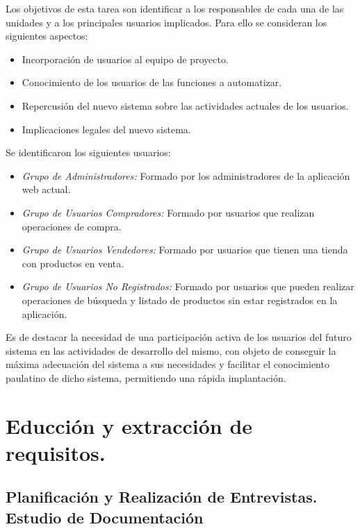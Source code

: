 Los objetivos de esta tarea son identificar a los responsables de cada una de las unidades y a los principales usuarios implicados. Para ello se consideran los siguientes aspectos:

\begin{itemize}
    \item Incorporación de usuarios al equipo de proyecto.
    \item Conocimiento de los usuarios de las funciones a automatizar.
    \item Repercusión del nuevo sistema sobre las actividades actuales de los usuarios.
    \item Implicaciones legales del nuevo sistema.
 
\end{itemize}

Se identificaron los siguientes usuarios:

 \begin{itemize}
 
\item \emph{Grupo de Administradores:} Formado por los administradores de la aplicación web actual.
 
\item \emph{Grupo de Usuarios Compradores:} Formado por usuarios que realizan operaciones de compra.
 
\item \emph{Grupo de Usuarios Vendedores:} Formado por usuarios  que tienen una tienda con productos en venta.
 
\item \emph{Grupo de Usuarios No Registrados:} Formado por usuarios que pueden realizar operaciones de búsqueda y listado de productos sin estar registrados en la aplicación.

 \end{itemize}
 
 Es de destacar la necesidad de una participación activa de los usuarios del futuro sistema en las actividades de desarrollo del mismo, con objeto de conseguir la máxima adecuación del sistema a sus necesidades y facilitar el conocimiento paulatino de dicho sistema, permitiendo una rápida implantación.

  \section{Educción y extracción de requisitos.}

  \subsection{Planificación y Realización de Entrevistas. Estudio de Documentación}
  
